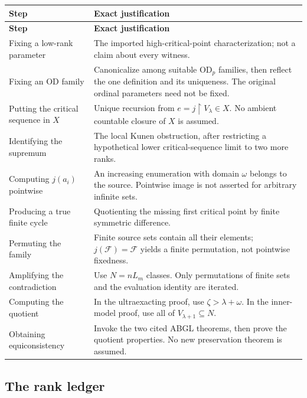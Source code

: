 \documentclass[11pt,letterpaper]{article}
\theoremstyle{definition}
\newcommand{\OD}{\mathrm{OD}}
\newcommand{\restr}{\mathbin{\upharpoonright}}
\newcommand{\FF}{\mathscr F}
\begin{document}
\begingroup\small
\renewcommand{\arraystretch}{1.16}
\begin{longtable}{@{}P{.25\textwidth}P{.68\textwidth}@{}}
\toprule
\textbf{Step}&\textbf{Exact justification}\\
\midrule\endfirsthead
\toprule\textbf{Step}&\textbf{Exact justification}\\\midrule\endhead
Fixing a low-rank parameter & The imported high-critical-point characterization; not a claim about every witness.\\[4pt]
Fixing an OD family & Canonicalize among suitable $\OD_p$ families, then reflect the one definition and its uniqueness. The original ordinal parameters need not be fixed.\\[4pt]
Putting the critical sequence in $X$ & Unique recursion from $e=j\restr V_\lambda\in X$. No ambient countable closure of $X$ is assumed.\\[4pt]
Identifying the supremum & The local Kunen obstruction, after restricting a hypothetical lower critical-sequence limit to two more ranks.\\[4pt]
Computing $j(a_i)$ pointwise & An increasing enumeration with domain $\omega$ belongs to the source. Pointwise image is not asserted for arbitrary infinite sets.\\[4pt]
Producing a true finite cycle & Quotienting the missing first critical point by finite symmetric difference.\\[4pt]
Permuting the family & Finite source sets contain all their elements; $j(\FF)=\FF$ yields a finite permutation, not pointwise fixedness.\\[4pt]
Amplifying the contradiction & Use $N=nL_m$ classes. Only permutations of finite sets and the evaluation identity are iterated.\\[4pt]
Computing the quotient & In the ultraexacting proof, use $\zeta>\lambda+\omega$. In the inner-model proof, use all of $V_{\lambda+1}\subseteq N$.\\[4pt]
Obtaining equiconsistency & Invoke the two cited ABGL theorems, then prove the quotient properties. No new preservation theorem is assumed.\\
\bottomrule
\end{longtable}
\endgroup

\Needspace{245pt}
\subsection{The rank ledger}
\end{document}
